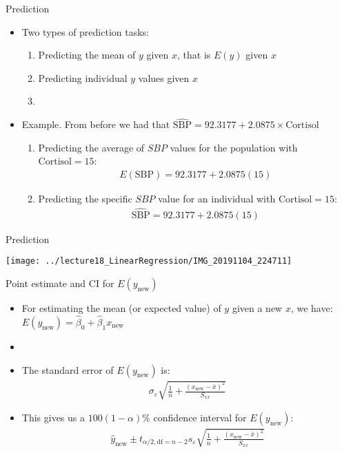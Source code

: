 \documentclass[xcolor=dvipsnames]{beamer}
\begin{document}
\begin{frame}{Prediction}
	\begin{itemize}
		\item Two types of prediction tasks:
		\begin{enumerate}
			\item Predicting the mean of $y$ given $x$, that is $E(y)$ given $x$
			\item Predicting individual $y$ values given $x$
			\item[]
		\end{enumerate}
		\item Example. From before we had that $\hat{\text{SBP}} = 92.3177 + 2.0875 \times \text{Cortisol}$
		\begin{enumerate}
			\item Predicting the average of $SBP$ values for the population with $\text{Cortisol} = 15$: 
			\begin{gather*}
				E(\text{SBP}) = 92.3177 + 2.0875(15)
			\end{gather*}
			\item Predicting the specific $SBP$ value for an individual with $\text{Cortisol} = 15$: 
			\begin{gather*}
				\hat{\text{SBP}} = 92.3177 + 2.0875(15)
			\end{gather*}
		\end{enumerate}
	\end{itemize}
\end{frame}

\begin{frame}{Prediction}
	\begin{center}
		\texttt{[image: ../lecture18\_LinearRegression/IMG\_20191104\_224711]}
	\end{center}
\end{frame}

\begin{frame}{Point estimate and CI for $E(y_{\text{new}})$}
	\begin{itemize}
		\item For estimating the mean (or expected value) of $y$ given a new $x$, we have: $E(y_{\text{new}}) = \hat{\beta}_0 + \hat{\beta}_1 x_{\text{new}}$
		\item[]
		\item The standard error of $E(y_{\text{new}})$ is: 
		\begin{gather*}
			\sigma_{\varepsilon} \sqrt{\frac{1}{n} + \frac{(x_{\text{new}}-\bar{x})^2}{S_{xx}}}
		\end{gather*}
		\item This gives us a $100(1-\alpha)\%$ confidence interval for $E(y_{\text{new}})$:
		\begin{gather*}
		\hat{y}_{\text{new}} \pm t_{\alpha / 2, \text{df} = n-2}s_{\varepsilon}\sqrt{\frac{1}{n} + \frac{(x_{\text{new}}-\bar{x})^2}{S_{xx}}}
		\end{gather*}
	\end{itemize}
\end{frame}
\end{document}
